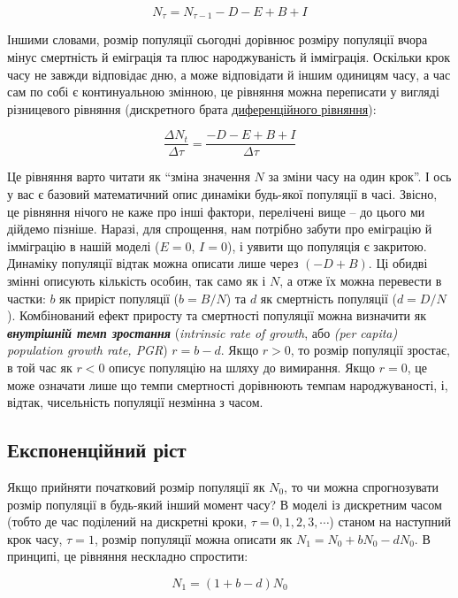 \documentclass[
  11pt,
]{book}
\begin{document}
\[N_{\tau} = N_{\tau - 1} - D - E + B + I\]

Іншими словами, розмір популяції сьогодні дорівнює розміру популяції вчора мінус смертність й еміграція та плюс народжуваність й імміграція. Оскільки крок часу не завжди відповідає дню, а може відповідати й іншим одиницям часу, а час сам по собі є континуальною змінною, це рівняння можна переписати у вигляді різницевого рівняння (дискретного брата \hyperref[algebra]{диференційного рівняння}):

\[\frac{\Delta N_t}{\Delta \tau} = \frac{-D-E+B+I}{\Delta \tau}\]

Це рівняння варто читати як ``зміна значення \(N\) за зміни часу на один крок''. І ось у вас є базовий математичний опис динаміки будь-якої популяції в часі. Звісно, це рівняння нічого не каже про інші фактори, перелічені вище -- до цього ми дійдемо пізніше. Наразі, для спрощення, нам потрібно забути про еміграцію й імміграцію в нашій моделі (\(E=0\), \(I=0\)), і уявити що популяція є закритою. Динаміку популяції відтак можна описати лише через \((-D+B)\). Ці обидві змінні описують кількість особин, так само як і \(N\), а отже їх можна перевести в частки: \(b\) як приріст популяції (\(b = B/N\)) та \(d\) як смертність популяції (\(d = D/N\)). Комбінований ефект приросту та смертності популяції можна визначити як \textbf{\emph{внутрішній темп зростання}} (\emph{intrinsic rate of growth}, або \emph{(per capita) population growth rate, PGR}) \(r = b - d\). Якщо \(r>0\), то розмір популяції зростає, в той час як \(r < 0\) описує популяцію на шляху до вимирання. Якщо \(r = 0\), це може означати лише що темпи смертності дорівнюють темпам народжуваності, і, відтак, чисельність популяції незмінна з часом.

\subsection{Експоненційний ріст}\label{ux435ux43aux441ux43fux43eux43dux435ux43dux446ux456ux439ux43dux438ux439-ux440ux456ux441ux442}

Якщо прийняти початковий розмір популяції як \(N_0\), то чи можна спрогнозувати розмір популяції в будь-який інший момент часу? В моделі із дискретним часом (тобто де час поділений на дискретні кроки, \(\tau = 0, 1, 2, 3, \cdots\)) станом на наступний крок часу, \(\tau=1\), розмір популяції можна описати як \(N_1 = N_0 + bN_0 - dN_0\). В принципі, це рівняння нескладно спростити:

\[N_1 = (1 + b - d)N_0\]
\end{document}

